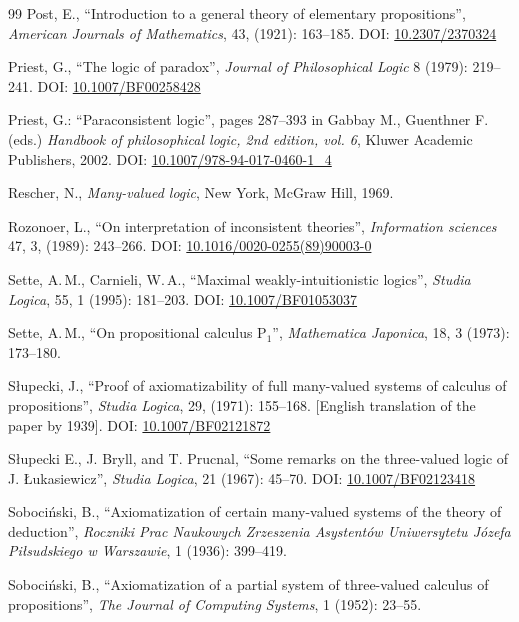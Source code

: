 \documentclass[10pt,a4paper]{article}
\theoremstyle{definition}
\newcommand{\3}{\vspace{.3in}}
\newcommand{\2}{\vspace{.2in}}
\newcommand{\1}{\vspace{.1in}}
\newcommand{\5}{\vspace{.05in}}
\newcommand\DOI[2]{DOI: \href{#1#2}{#2}}
\newcommand{\ts}{\,}
\begin{document}
\begin{thebibliography}{99}
Post, E., ``Introduction to a general theory of elementary propositions'', \textit{American Journals of Mathematics}, 43, (1921): 163--185.
\DOI{http://dx.doi.org/}{10.2307/2370324}

Priest, G., ``The logic of paradox'', \textit{Journal of Philosophical Logic} 8 (1979): 219--241.
\DOI{http://dx.doi.org/}{10.1007/BF00258428}

 Priest, G.: ``Paraconsistent logic'', pages 287--393 in Gabbay M., Guenthner F.(eds.) \textit{Handbook of philosophical logic, 2nd edition, vol. 6}, Kluwer Academic Publishers, 2002. 
\DOI{http://dx.doi.org/}{10.1007/978-94-017-0460-1\_4}

Rescher, N.,  \textit{Many-valued logic}, New York, McGraw Hill, 1969.

Rozonoer, L., ``On interpretation of inconsistent theories'', \textit{Information sciences} 47, 3, (1989): 243--266.
\DOI{http://dx.doi.org/}{10.1016/0020-0255(89)90003-0}

Sette, A.\ts M., Carnieli, W.\ts A.,  
``Maximal weakly-intuitionistic logics'', \textit{Studia Logica}, 55, 1 (1995):  181--203.
\DOI{http://dx.doi.org/}{10.1007/BF01053037}

Sette, A.\ts M., ``On propositional calculus P$ _{1} $'', \textit{Mathematica Japonica}, 18, 3 (1973): 173--180.

S\l{}upecki, J.,  ``Proof of axiomatizability of full many-valued systems of calculus of propositions'', \textit{Studia Logica}, 29, (1971): 155--168. [English translation of the paper by 1939]. \DOI{http://dx.doi.org/}{10.1007/BF02121872}


S\l{}upecki E., J. Bryll, and T. Prucnal, ``Some remarks on the three-valued logic of J. \L{}ukasiewicz'', \textit{Studia Logica}, 21 (1967): 45--70.
\DOI{http://dx.doi.org/}{10.1007/BF02123418}

Soboci\'{n}ski, B., ``Axiomatization of certain many-valued systems of the theory of deduction'',  \textit{Roczniki Prac Naukowych Zrzeszenia Asystent\'ow Uniwersytetu J\'ozefa Pi\l sudskiego w Warszawie}, 1 (1936): 399--419.

Soboci\'{n}ski, B., ``Axiomatization of a partial system of three-valued calculus of propositions'', \textit{The Journal of Computing Systems}, 1 (1952): 23--55.


\end{thebibliography}
\end{document}
